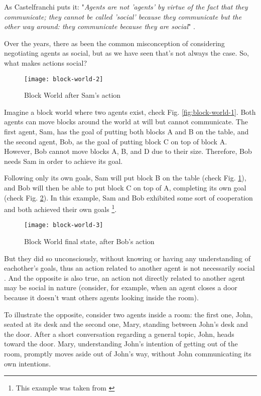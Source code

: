 As Castelfranchi puts it: "\textit{Agents are not 'agents' by virtue of the fact that they communicate;
they cannot be called 'social' because they communicate but the other way around: they communicate because they are social}" \cite{castelfranchi:socialactions}.

Over the years, there as been the common misconception of considering negotiating agents as social, but as we have seen that's not always the case.
So, what makes actions social?

\begin{figure}
  \centering
    \texttt{[image: block-world-2]}
  \caption{Block World after Sam's action}
  \label{fig:block-world-2}
\end{figure}

Imagine a block world where two agents exist, check Fig. \ref{fig:block-world-1}.
Both agents can move blocks around the world at will but cannot communicate.
The first agent, Sam, has the goal of putting both blocks A and B on the table, and the second agent, Bob, as the goal of putting block C on top of block A.
However, Bob cannot move blocks A, B, and D due to their size.
Therefore, Bob needs Sam in order to achieve its goal.

Following only its own goals, Sam will put block B on the table (check Fig. \ref{fig:block-world-2}), and Bob will then be able to put block C on top of A, completing its own goal (check Fig. \ref{fig:block-world-3}).
In this example, Sam and Bob exhibited some sort of cooperation and both achieved their own goals \footnote{This example was taken from \cite{castelfranchi:socialactions}}.

\begin{figure}
  \centering
    \texttt{[image: block-world-3]}
  \caption{Block World final state, after Bob's action}
  \label{fig:block-world-3}
\end{figure}

But they did so unconsciously, without knowing or having any understanding of eachother's goals, thus an action related to another agent is not necessarily social \cite{castelfranchi:individualsocialaction}.
And the opposite is also true, an action not directly related to another agent may be social in nature (consider, for example, when an agent closes a door because it doesn't want others agents looking inside the room).

To illustrate the opposite, consider two agents inside a room: the first one, John, seated at its desk and the second one, Mary, standing between John's desk and the door.
After a short conversation regarding a general topic, John, heads toward the door.
Mary, understanding John's intention of getting out of the room, promptly moves aside out of John's way, without John communicating its own intentions.

